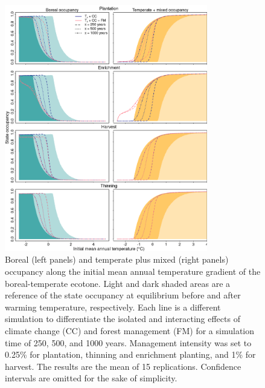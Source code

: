 \hypertarget{fig:sim-result-supp4_ch1}{%
\begin{figure}
\centering
\includegraphics[width=0.79\textwidth,height=\textheight]{manuscript/img/sim-result_supp2.png}
\caption[{Boreal (left panels) and temperate plus mixed (right panels)
occupancy along the initial mean annual temperature gradient of the
boreal-temperate ecotone.}]{Boreal (left panels) and temperate plus
mixed (right panels) occupancy along the initial mean annual temperature
gradient of the boreal-temperate ecotone. Light and dark shaded areas
are a reference of the state occupancy at equilibrium before and after
warming temperature, respectively. Each line is a different simulation
to differentiate the isolated and interacting effects of climate change
(CC) and forest management (FM) for a simulation time of 250, 500, and
1000 years. Management intensity was set to 0.25\% for plantation,
thinning and enrichment planting, and 1\% for harvest. The results are
the mean of 15 replications. Confidence intervals are omitted for the
sake of simplicity.}
\label{fig:sim-result-supp4_ch1}
\end{figure}
}

\newpage


